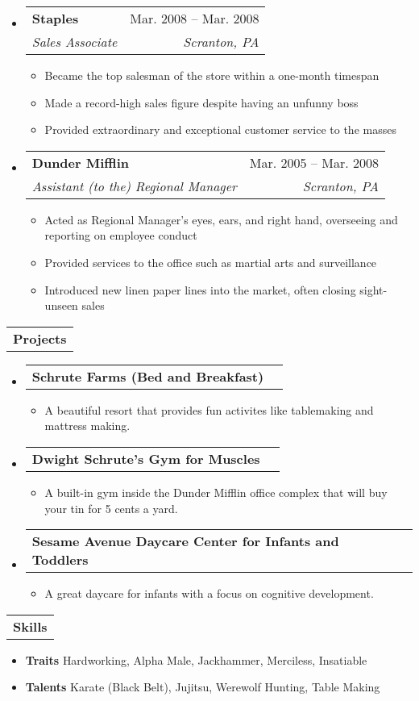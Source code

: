 \documentclass[letterpaper,12pt]{article}[leftmargin=*]
\makeatletter
\def \entryspacing {0pt}
\renewcommand{\section}[1]{
  \begin{tabularx}{\textwidth} {X}
    \rowcolor{secondary}
    \hspace{5pt}\color{white}\textbf{#1}\\
  \end{tabularx}
  \vspace{-10pt}
}
\newcommand{\resumeEntryStart}{\begin{itemize}[leftmargin=2.5mm]}
\newcommand{\resumeEntryEnd}{\end{itemize}\vspace{\entryspacing}}
\newcommand{\resumeItemListStart}{\begin{itemize}[leftmargin=4.5mm]}
\newcommand{\resumeItemListEnd}{\end{itemize}}
\newcommand{\resumeItem}[1]{
  \item{
    {#1 \vspace{-2pt}}
  }
}
\newcommand{\resumeEntryTSDL}[4]{
  \vspace{-1pt}\item[]
  \begin{tabularx}{0.97\textwidth}{X@{\hspace{60pt}}r}
    \textbf{\color{primary}#1} & {\firabook\color{accent}\small#2} \\
    \textit{\color{accent}\small#3} & \textit{\color{accent}\small#4} \\
  \end{tabularx}\vspace{-6pt}
}
\newcommand{\resumeEntryTD}[2]{
  \vspace{-1pt}\item[]
  \begin{tabularx}{0.97\textwidth}{X@{\hspace{60pt}}r}
    \textbf{\color{primary}#1} & {\firabook\color{accent}\small#2} \\
  \end{tabularx}\vspace{-6pt}
}
\newcommand{\resumeEntryS}[2]{
\item[]\small{
  \textbf{\color{primary}#1 }{ #2 \vspace{-6pt}}
}
}
\makeatother
\begin{document}
  \resumeEntryStart
    \resumeEntryTSDL
      {Staples}{Mar. 2008 -- Mar. 2008}
      {Sales Associate}{Scranton, PA}
    \resumeItemListStart
        \resumeItem {Became the top salesman of the store within a one-month timespan}
        \resumeItem {Made a record-high sales figure despite having an unfunny boss}
        \resumeItem {Provided extraordinary and exceptional customer service to the masses}
    \resumeItemListEnd
  \resumeEntryEnd

  \resumeEntryStart
    \resumeEntryTSDL
      {Dunder Mifflin}{Mar. 2005 -- Mar. 2008}
      {Assistant (to the) Regional Manager}{Scranton, PA}
    \resumeItemListStart
      \resumeItem {Acted as Regional Manager's eyes, ears, and right hand, overseeing and reporting on employee conduct}
      \resumeItem {Provided services to the office such as martial arts and surveillance}
      \resumeItem {Introduced new linen paper lines into the market, often closing sight-unseen sales}
    \resumeItemListEnd
  \resumeEntryEnd


\section{Projects}

  \resumeEntryStart
    \resumeEntryTD
      {Schrute Farms (Bed and Breakfast)}{}
    \resumeItemListStart
      \resumeItem {A beautiful resort that provides fun activites like tablemaking and mattress making.}
    \resumeItemListEnd
  \resumeEntryEnd

  \resumeEntryStart
    \resumeEntryTD
      {Dwight Schrute's Gym for Muscles}{}
    \resumeItemListStart
      \resumeItem {A built-in gym inside the Dunder Mifflin office complex that will buy your tin for 5 cents a yard.}
    \resumeItemListEnd
  \resumeEntryEnd

  \resumeEntryStart
    \resumeEntryTD
      {Sesame Avenue Daycare Center for Infants and Toddlers}{}
    \resumeItemListStart
      \resumeItem {A great daycare for infants with a focus on cognitive development.}
    \resumeItemListEnd
  \resumeEntryEnd

\section{Skills}
 \resumeEntryStart
  \resumeEntryS{Traits } {Hardworking, Alpha Male, Jackhammer, Merciless, Insatiable}
  \resumeEntryS{Talents } {Karate (Black Belt), Jujitsu, Werewolf Hunting, Table Making}
 \resumeEntryEnd
\end{document}
